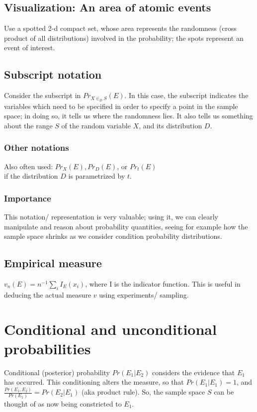 \documentclass[oneside, article]{memoir}
\begin{document}
\subsection{Visualization: An area of atomic events}
Use a spotted 2-d compact set, whose area represents the randomness (cross product of all distributions) involved in the probability; the spots represent an event of interest.

\subsection{Subscript notation}
Consider the subscript in $Pr_{X \in_{D} S}(E)$. In this case, the subscript indicates the variables which need to be specified in order to specify a point in the sample space; in doing so, it tells us where the randomness lies. It also tells us something about the range $S$ of the random variable $X$, and its distribution $D$.

\subsubsection{Other notations}
Also often used: $Pr_{X}(E), Pr_{D}(E)$, or  $Pr_{t}(E)$\\
 if the distribution $D$ is parametrized by $t$.

\subsubsection{Importance}
This notation/ representation is very valuable; using it, we can clearly manipulate and reason about probability quantities, seeing for example how the sample space shrinks as we consider condition probability distributions.

\subsection{Empirical measure}
$v_n(E) = n^{-1}\sum_{i} I_{E}(x_i)$, where I is the indicator function. This is useful in deducing the actual measure $v$ using experiments/ sampling.

\section{Conditional and unconditional probabilities}
Conditional (posterior) probability $Pr(E_1|E_2)$ considers the evidence that $E_1$ has occurred. This conditioning alters the measure, so that $Pr(E_1|E_1) = 1$, and $\frac{Pr(E_1, E_2)}{Pr(E_1)} = Pr(E_2|E_1)$ (aka product rule). So, the sample space $S$ can be thought of as now being constricted to $E_1$.
\end{document}
